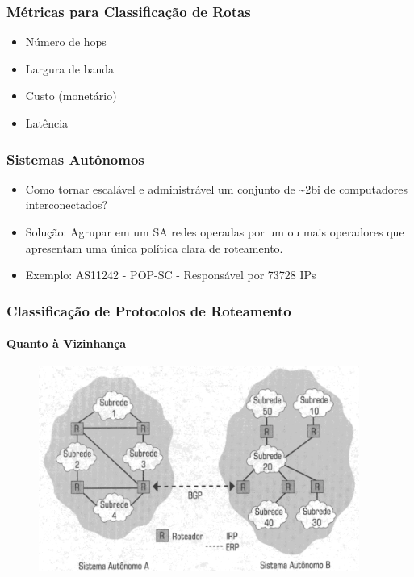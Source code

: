 \documentclass{beamer}
\begin{document}
\begin{frame}
\frametitle{Métricas para Classificação de Rotas}
\begin{itemize}
  \setlength{\itemsep}{0.7cm}%
  \item Número de hops
  \item Largura de banda
  \item Custo (monetário)
  \item Latência
\end{itemize}
\end{frame}

\begin{frame}
\frametitle{Sistemas Autônomos}
\begin{itemize}
  \setlength{\itemsep}{0.7cm}%
  \item Como tornar escalável e administrável um conjunto de \textasciitilde2bi de
  computadores interconectados?
  \item Solução: Agrupar em um SA redes operadas por um ou mais operadores que apresentam uma única política clara de roteamento.
  \item Exemplo: AS11242 - POP-SC - Responsável por 73728 IPs 
\end{itemize}
\end{frame}

\begin{frame}
\frametitle{Classificação de Protocolos de Roteamento}
\framesubtitle{Quanto à Vizinhança}
\begin{figure}[htp]
\begin{center}
  \includegraphics[width=105mm]{Imagens/SistemaAutonomo.png}
  \label{sistema_autonomo}
\end{center}
\end{figure}
\end{frame}
\end{document}
